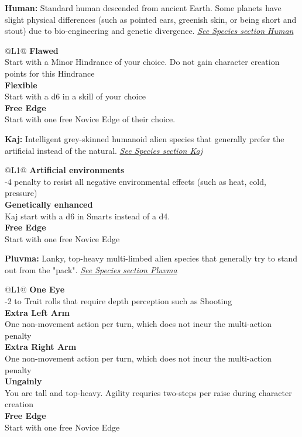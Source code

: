 \begin{enumerate}
  \textbf{Human:} Standard human descended from ancient Earth. Some planets have slight physical differences (such as pointed ears, greenish skin, or being short and stout) due to bio-engineering and genetic divergence. \textit{\hyperref[sec:specie-human]{See Species section Human}}
  \begin{redtable}{\linewidth}{@{}L{1}@{}}
    \textbf{Flawed}\\
    Start with a Minor Hindrance of your choice. Do not gain character creation points for this Hindrance\\
    \textbf{Flexible}\\
    Start with a d6 in a skill of your choice\\
    \textbf{Free Edge}\\
    Start with one free Novice Edge of their choice.\\
  \end{redtable}
  
  \hline
  
  \textbf{Kaj:} Intelligent grey-skinned humanoid alien species that generally prefer the artificial instead of the natural. \textit{\hyperref[sec:specie-kaj]{See Species section Kaj}}
  \begin{redtable}{\linewidth}{@{}L{1}@{}}
    \textbf{Artificial environments}\\
    -4 penalty to resist all negative environmental effects (such as heat, cold, pressure)\\
    \textbf{Genetically enhanced}\\
    Kaj start with a d6 in Smarts instead of a d4.\\
    \textbf{Free Edge}\\
    Start with one free Novice Edge\\
  \end{redtable}
  
  \hline
  
  \textbf{Pluvma:} Lanky, top-heavy multi-limbed alien species that generally try to stand out from the "pack". \textit{\hyperref[sec:specie-pluvma]{See Species section Pluvma}}
  \begin{redtable}{\linewidth}{@{}L{1}@{}}
    \textbf{One Eye}\\
    -2 to Trait rolls that require depth perception such as Shooting\\
    \textbf{Extra Left Arm}\\
    One non-movement action per turn, which does not incur the multi-action penalty\\
    \textbf{Extra Right Arm}\\
    One non-movement action per turn, which does not incur the multi-action penalty\\
    \textbf{Ungainly}\\
    You are tall and top-heavy. Agility requries two-steps per raise during character creation\\
    \textbf{Free Edge}\\
    Start with one free Novice Edge\\
  \end{redtable}
  

\end{enumerate}
